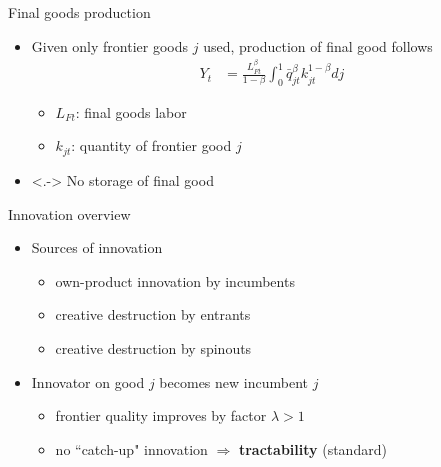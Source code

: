 \documentclass[english,usenames,dvipsnames]{beamer}
\begin{document}
\begin{frame}{Final goods production}\label{main:final_goods_production}
	\begin{itemize}
		\item<+-> Given only frontier goods $j$ used, production of final good follows
		\begin{align*}
		Y_t &= \frac{L_{Ft}^{\beta}}{1-\beta} \int_0^1 \bar{q}_{jt}^{\beta} k_{jt}^{1-\beta} dj 
		\end{align*}
		\begin{itemize}
			\item $L_{Ft}$: final goods labor
			\item $k_{jt}$: quantity of frontier good $j$
		\end{itemize} \hyperlink{definition:final_goods_production}{} 
		\smallskip
		\item<.-> No storage of final good
	\end{itemize}
\end{frame}

\begin{frame}{Innovation overview}
	\begin{itemize}
		\item<+-> Sources of innovation
		\begin{itemize}
			\item own-product innovation by incumbents
			\item creative destruction by entrants 
			\item creative destruction by spinouts
		\end{itemize}
		\medskip
		\item<+-> Innovator on good $j$ becomes new incumbent $j$
		\begin{itemize}
			\item<+-> frontier quality improves by factor $\lambda > 1$
			\item<+-> no ``catch-up" innovation $\Rightarrow$ \alert{\textbf{tractability}} (standard)
		\end{itemize}
	\end{itemize}
\end{frame}
\end{document}
